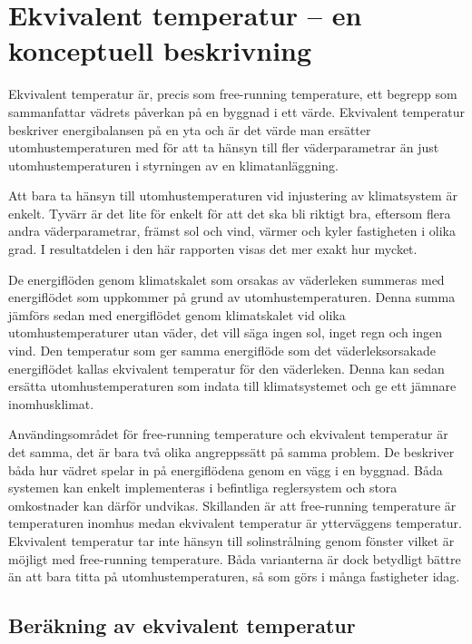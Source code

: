 
\section{Ekvivalent temperatur  – en konceptuell beskrivning}
\label{sec:ekv_temp}

Ekvivalent temperatur är, precis som free-running temperature, ett begrepp som sammanfattar vädrets påverkan på en byggnad i ett värde. Ekvivalent temperatur beskriver energibalansen på en yta och är det värde man ersätter utomhustemperaturen med för att ta 
hänsyn till fler väderparametrar än just utomhustemperaturen i styrningen av en 
klimatanläggning.

Att bara ta hänsyn till utomhustemperaturen vid injustering av klimatsystem är enkelt. 
Tyvärr är det lite för enkelt för att det ska bli riktigt bra, eftersom flera andra 
väderparametrar, främst sol och vind, värmer och kyler fastigheten i olika grad. I resultatdelen i den här rapporten visas det mer exakt hur mycket.

De energiflöden genom klimatskalet som orsakas av väderleken summeras med energiflödet som uppkommer på grund av utomhustemperaturen. Denna summa jämförs sedan med energiflödet genom klimatskalet vid olika utomhustemperaturer utan väder, det vill säga ingen sol, inget regn och ingen vind. Den temperatur som ger 
samma energiflöde som det väderleksorsakade energiflödet kallas ekvivalent temperatur för den väderleken. Denna kan sedan ersätta 
utomhustemperaturen som indata till klimatsystemet och ge ett jämnare inomhusklimat. 

Användingsområdet för free-running temperature och ekvivalent temperatur är det samma, det är bara två olika angreppssätt på samma problem. De beskriver båda hur vädret spelar in på energiflödena genom en vägg i en byggnad.  Båda systemen kan enkelt implementeras i befintliga reglersystem och stora omkostnader kan därför undvikas. Skillanden är att free-running temperature är temperaturen inomhus medan ekvivalent temperatur är ytterväggens temperatur. Ekvivalent temperatur tar inte hänsyn till solinstrålning genom fönster vilket är möjligt med free-running temperature. Båda varianterna är dock betydligt bättre än att bara titta på utomhustemperaturen, så som görs i många fastigheter idag.

\subsection{Beräkning av ekvivalent temperatur}


